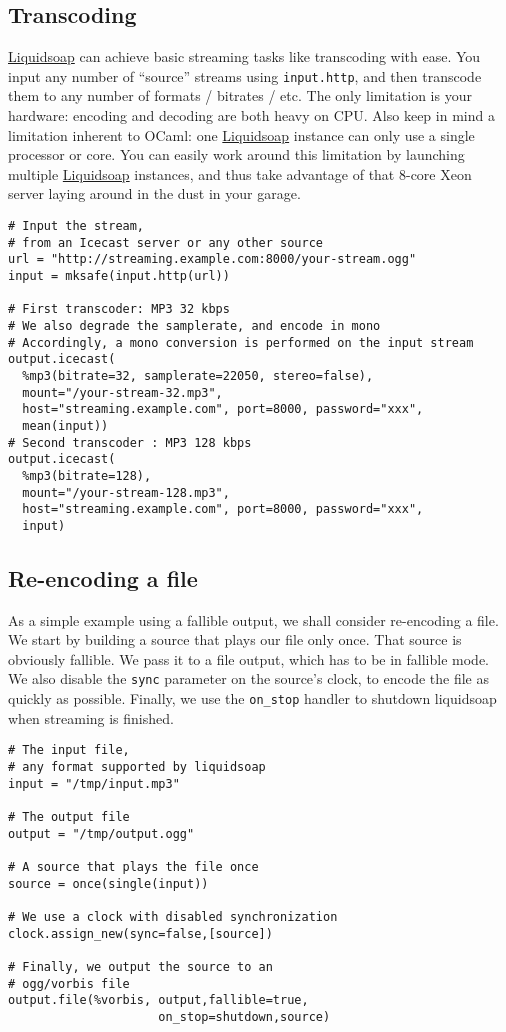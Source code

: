 \subsection{Transcoding}
\href{index.html}{Liquidsoap} can achieve basic streaming tasks like transcoding with ease. You input any number of ``source'' streams using \verb+input.http+, and then transcode them to any number of formats / bitrates / etc. The only limitation is your hardware: encoding and decoding are both heavy on CPU. Also keep in mind a limitation inherent to OCaml: one \href{index.html}{Liquidsoap} instance can only use a single processor or core. You can easily work around this limitation by launching multiple \href{index.html}{Liquidsoap} instances, and thus take advantage of that 8-core Xeon server laying around in the dust in your garage.

\begin{verbatim}
# Input the stream,
# from an Icecast server or any other source
url = "http://streaming.example.com:8000/your-stream.ogg"
input = mksafe(input.http(url))

# First transcoder: MP3 32 kbps
# We also degrade the samplerate, and encode in mono
# Accordingly, a mono conversion is performed on the input stream
output.icecast(
  %mp3(bitrate=32, samplerate=22050, stereo=false),
  mount="/your-stream-32.mp3",
  host="streaming.example.com", port=8000, password="xxx",
  mean(input))
# Second transcoder : MP3 128 kbps
output.icecast(
  %mp3(bitrate=128), 
  mount="/your-stream-128.mp3",
  host="streaming.example.com", port=8000, password="xxx",
  input)
\end{verbatim}
\subsection{Re-encoding a file}
As a simple example using a fallible output, we shall consider
re-encoding a file.
We start by building a source that plays our file only once.
That source is obviously fallible.
We pass it to a file output, which has to be in fallible mode.
We also disable the \verb+sync+ parameter on the source's clock,
to encode the file as quickly as possible.
Finally, we use the \verb+on_stop+ handler to shutdown
liquidsoap when streaming is finished.

\begin{verbatim}
# The input file,
# any format supported by liquidsoap
input = "/tmp/input.mp3"

# The output file
output = "/tmp/output.ogg"

# A source that plays the file once
source = once(single(input))

# We use a clock with disabled synchronization
clock.assign_new(sync=false,[source])

# Finally, we output the source to an
# ogg/vorbis file
output.file(%vorbis, output,fallible=true,
                     on_stop=shutdown,source)
\end{verbatim}

